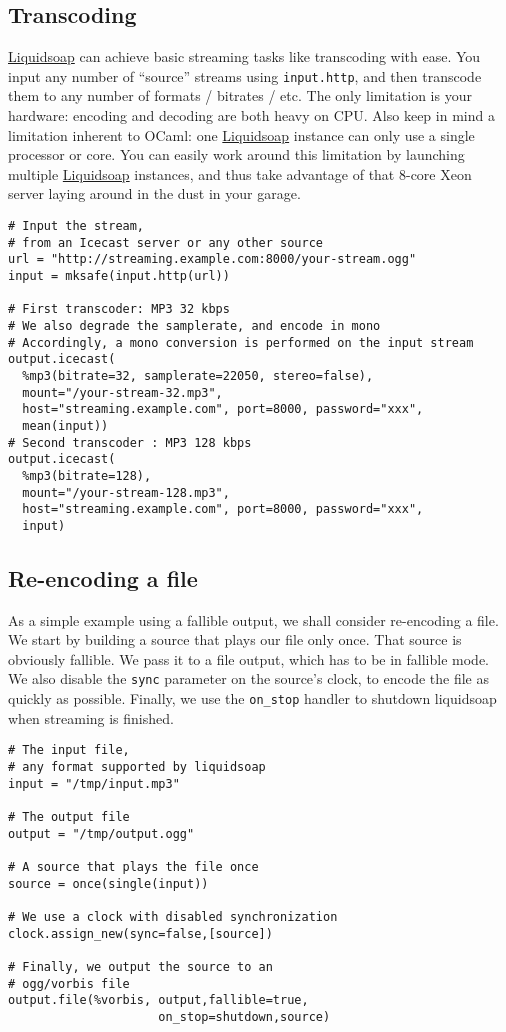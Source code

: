 \subsection{Transcoding}
\href{index.html}{Liquidsoap} can achieve basic streaming tasks like transcoding with ease. You input any number of ``source'' streams using \verb+input.http+, and then transcode them to any number of formats / bitrates / etc. The only limitation is your hardware: encoding and decoding are both heavy on CPU. Also keep in mind a limitation inherent to OCaml: one \href{index.html}{Liquidsoap} instance can only use a single processor or core. You can easily work around this limitation by launching multiple \href{index.html}{Liquidsoap} instances, and thus take advantage of that 8-core Xeon server laying around in the dust in your garage.

\begin{verbatim}
# Input the stream,
# from an Icecast server or any other source
url = "http://streaming.example.com:8000/your-stream.ogg"
input = mksafe(input.http(url))

# First transcoder: MP3 32 kbps
# We also degrade the samplerate, and encode in mono
# Accordingly, a mono conversion is performed on the input stream
output.icecast(
  %mp3(bitrate=32, samplerate=22050, stereo=false),
  mount="/your-stream-32.mp3",
  host="streaming.example.com", port=8000, password="xxx",
  mean(input))
# Second transcoder : MP3 128 kbps
output.icecast(
  %mp3(bitrate=128), 
  mount="/your-stream-128.mp3",
  host="streaming.example.com", port=8000, password="xxx",
  input)
\end{verbatim}
\subsection{Re-encoding a file}
As a simple example using a fallible output, we shall consider
re-encoding a file.
We start by building a source that plays our file only once.
That source is obviously fallible.
We pass it to a file output, which has to be in fallible mode.
We also disable the \verb+sync+ parameter on the source's clock,
to encode the file as quickly as possible.
Finally, we use the \verb+on_stop+ handler to shutdown
liquidsoap when streaming is finished.

\begin{verbatim}
# The input file,
# any format supported by liquidsoap
input = "/tmp/input.mp3"

# The output file
output = "/tmp/output.ogg"

# A source that plays the file once
source = once(single(input))

# We use a clock with disabled synchronization
clock.assign_new(sync=false,[source])

# Finally, we output the source to an
# ogg/vorbis file
output.file(%vorbis, output,fallible=true,
                     on_stop=shutdown,source)
\end{verbatim}

